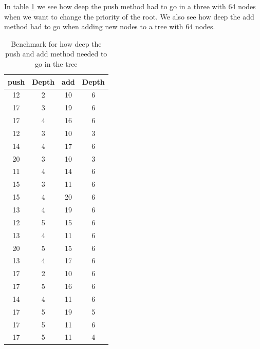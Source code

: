 \documentclass[a4paper,11pt]{article}
\begin{document}
In table \ref{tab:tree} we see how deep the push method had to go in a three with 64 nodes when we want to change 
the priority of the root. We also see how deep the add method had to go when adding new nodes to a tree with 64 
nodes.
\begin{table}[h!]
    \begin{center}
        \begin{tabular}{|c|c|c|c|}
            \hline
            \textbf{push} & \textbf{Depth} & \textbf{add} & \textbf{Depth}\\
            \hline
             12        & 2    & 10    & 6                           \\
             17        & 3    & 19    & 6                           \\
             17        & 4    & 16    & 6                           \\
             12        & 3    & 10    & 3                           \\
             14        & 4    & 17    & 6                           \\
             20        & 3    & 10    & 3                           \\
             11        & 4    & 14    & 6                           \\
             15        & 3    & 11    & 6                           \\
             15        & 4    & 20    & 6                           \\
             13        & 4    & 19    & 6                           \\
             12        & 5    & 15    & 6                           \\
             13        & 4    & 11    & 6                           \\
             20        & 5    & 15    & 6                           \\
             13        & 4    & 17    & 6                           \\
             17        & 2    & 10    & 6                           \\
             17        & 5    & 16    & 6                           \\
             14         &4    & 11    & 6                           \\
             17         &5    & 19    & 5                           \\
             17         &5    & 11    & 6                           \\
             17         &5    & 11    & 4                           \\
            \hline
        \end{tabular}
        \caption{Benchmark for how deep the push and add method needed to go in the tree}
        \label{tab:tree}
    \end{center}
\end{table}
\FloatBarrier
\end{document}
